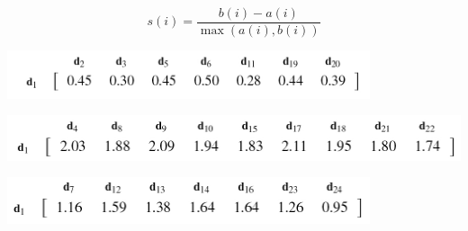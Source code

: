 \documentclass[xcolor={table}]{beamer}
\begin{document}
 \begin{frame} 
    \begin{equation}
    s(i)= \frac{b(i)-a(i)}{\max(a(i), b(i))}
    \label{eqn:silhouette_width}
    \end{equation}
\end{frame} 


\begin{frame}

\noindent \includegraphics[width=0.8\textwidth]{images/fmlpda_eqn_10_1.pdf}

\noindent \includegraphics[width=\textwidth]{images/fmlpda_eqn_10_2.pdf}

\noindent \includegraphics[width=0.8\textwidth]{images/fmlpda_eqn_10_3.pdf}

\end{frame}
\end{document}
